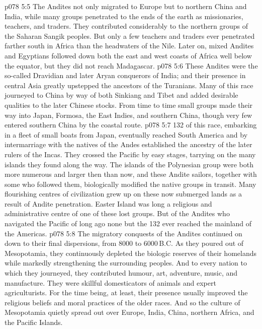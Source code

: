 \vs p078 5:5 \pc The Andites not only migrated to Europe but to northern China and India, while many groups penetrated to the ends of the earth as missionaries, teachers, and traders. They contributed considerably to the northern groups of the Saharan Sangik peoples. But only a few teachers and traders ever penetrated farther south in Africa than the headwaters of the Nile. Later on, mixed Andites and Egyptians followed down both the east and west coasts of Africa well below the equator, but they did not reach Madagascar.
\vs p078 5:6 These Andites were the so\hyp{}called Dravidian and later Aryan conquerors of India; and their presence in central Asia greatly upstepped the ancestors of the Turanians. Many of this race journeyed to China by way of both Sinkiang and Tibet and added desirable qualities to the later Chinese stocks. From time to time small groups made their way into Japan, Formosa, the East Indies, and southern China, though very few entered southern China by the coastal route.
\vs p078 5:7 132 of this race, embarking in a fleet of small boats from Japan, eventually reached South America and by intermarriage with the natives of the Andes established the ancestry of the later rulers of the Incas. They crossed the Pacific by easy stages, tarrying on the many islands they found along the way. The islands of the Polynesian group were both more numerous and larger then than now, and these Andite sailors, together with some who followed them, biologically modified the native groups in transit. Many flourishing centres of civilization grew up on these now submerged lands as a result of Andite penetration. Easter Island was long a religious and administrative centre of one of these lost groups. But of the Andites who navigated the Pacific of long ago none but the 132 ever reached the mainland of the Americas.
\vs p078 5:8 \pc The migratory conquests of the Andites continued on down to their final dispersions, from 8000 to 6000\,B.C. As they poured out of Mesopotamia, they continuously depleted the biologic reserves of their homelands while markedly strengthening the surrounding peoples. And to every nation to which they journeyed, they contributed humour, art, adventure, music, and manufacture. They were skillful domesticators of animals and expert agriculturists. For the time being, at least, their presence usually improved the religious beliefs and moral practices of the older races. And so the culture of Mesopotamia quietly spread out over Europe, India, China, northern Africa, and the Pacific Islands.
